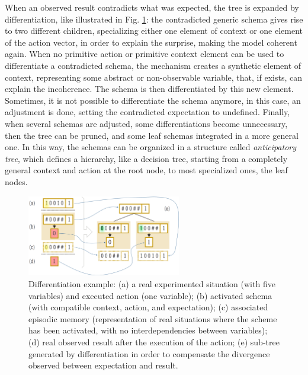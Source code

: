 \documentclass[runningheads]{llncs}
\begin{document}
When an observed result contradicts what was expected, the tree is expanded by differentiation, like illustrated in Fig. \ref{fig:perotto_diff}: the contradicted generic schema gives rise to two different children, specializing either one element of context or one element of the action vector, in order to explain the surprise, making the model coherent again.
When no primitive action or primitive context element can be used to differentiate a contradicted schema, the mechanism creates a synthetic element of context, representing some abstract or non-observable variable, that, if exists, can explain the incoherence. 
The schema is then differentiated by this new element.
Sometimes, it is not possible to differentiate the schema anymore, in this case, an adjustment is done, setting the contradicted expectation to undefined.
Finally, when several schemas are adjusted, some differentiations become unnecessary, then the tree can be pruned, and some leaf schemas integrated in a more general one.
In this way, the schemas can be organized in a structure called \textit{anticipatory tree}, 
which defines a hierarchy, like a decision tree, starting from a completely general context and action at the root node, to most specialized ones, the leaf nodes.
%
\begin{figure}
	\centering
	\includegraphics[width=0.6\textwidth]{Figure_perotto_differentiation_arrows.png}
	\caption{Differentiation example: (a) a real experimented situation (with five variables) and executed action (one variable); (b) activated schema (with compatible context, action, and expectation); (c) associated episodic memory (representation of real situations where the scheme has been activated, with no interdependencies between variables);
(d) real observed result after the execution of the action; (e) sub-tree generated by differentiation in order to compensate the divergence observed between expectation and result.} 
	\label{fig:perotto_diff}
\end{figure}
\end{document}
